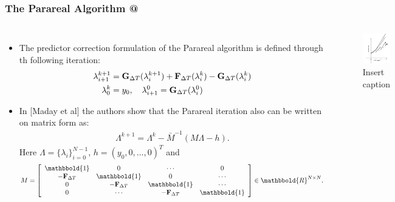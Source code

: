 \documentclass[9pt]{beamer}
\makeatletter
\newcommand*{\rom}[1]{\expandafter\@slowromancap\romannumeral #1@}
\makeatother
\begin{document}
\begin{frame}
\frametitle{The Parareal Algorithm \rom{2}}
\begin{columns}
\begin{itemize}
\item{The predictor correction formulation of the Parareal algorithm is defined through th following iteration:
{\small \begin{align*}
\lambda_{i+1}^{k+1} &= \bold{G}_{\Delta T}(\lambda_{i}^{k+1})+\bold{F}_{\Delta T}(\lambda_{i}^{k})-\bold{G}_{\Delta T}(\lambda_{i}^{k}) \\
\lambda_0^k&=y_0,\quad \lambda_{i+1}^0 = \bold{G}_{\Delta T}(\lambda_{i}^{0})
\end{align*}}}
\item{In [Maday et al] the authors show that the Parareal iteration also can be written on matrix form as:
{\small \begin{align*}
\Lambda^{k+1} = \Lambda^k -\bar M^{-1}(M\Lambda-h).
\end{align*}}
Here $\Lambda=\{\lambda_i\}_{i=0}^{N-1}$, $h=(y_0,0,...,0)^T$ and
{\tiny\begin{align*}
M = \left[ \begin{array}{cccc}
   \mathbbold{1} & 0 & \cdots & 0 \\  
   -\bold{F}_{\Delta T} & \mathbbold{1} & 0 & \cdots \\ 
   0 &-\bold{F}_{\Delta T} & \mathbbold{1}  & \cdots \\
   0 &\cdots &-\bold{F}_{\Delta T} & \mathbbold{1}  \\
   \end{array}  \right]\in\mathbbold{R}^{N\times N}.
\end{align*}} }
\end{itemize}
\begin{figure}
\includegraphics[scale=0.4]{parareal2.png}
\caption{Insert caption}
\end{figure}
\end{columns}
\end{frame}
\end{document}
